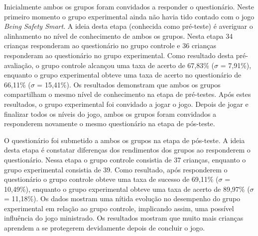 
Inicialmente ambos os grupos foram convidados a responder o questionário. Neste primeiro momento o grupo experimental ainda não havia tido contado com o jogo \textit{Being Safety Smart}. A ideia desta etapa (conhecida como pré-teste) é averiguar o alinhamento no nível de conhecimento de ambos os grupos. Nesta etapa 34 crianças responderam ao questionário no grupo controle e 36 crianças responderam ao questionário no grupo experimental. Como resultado desta pré-avaliação, o grupo controle alcançou uma taxa de acerto de 67,83\% ($\sigma$ = 7,91\%), enquanto o grupo experimental obteve uma taxa de acerto no questionário de 66,11\% ($\sigma$ = 15,41\%). Os resultados demonstram que ambos os grupos compartilham o mesmo nível de conhecimento na etapa de pré-testes. Após estes resultados, o grupo experimental foi convidado a jogar o jogo. Depois de jogar e finalizar todos os níveis do jogo, ambos os grupos foram convidados a responderem novamente o mesmo questionário na etapa de pós-teste. 

O questionário foi submetido a ambos os grupos na etapa de pós-teste. A ideia desta etapa é constatar diferenças dos rendimentos dos grupos ao responderem o questionário. Nessa etapa o grupo controle consistia de 37 crianças, enquanto o grupo experimental consistia de 39. Como resultado, após responderem o questionário o grupo controle obteve uma taxa de sucesso de 69,11\% ($\sigma$ = 10,49\%), enquanto o grupo experimental obteve uma taxa de acerto de 89,97\% ($\sigma$ = 11,18\%). Os dados mostram uma nítida evolução no desempenho do grupo experimental em relação ao grupo controle, implicando assim, uma possível influência do jogo ministrado. Os resultados mostram que muito mais crianças aprendem a se protegerem devidamente depois de concluir o jogo. %




